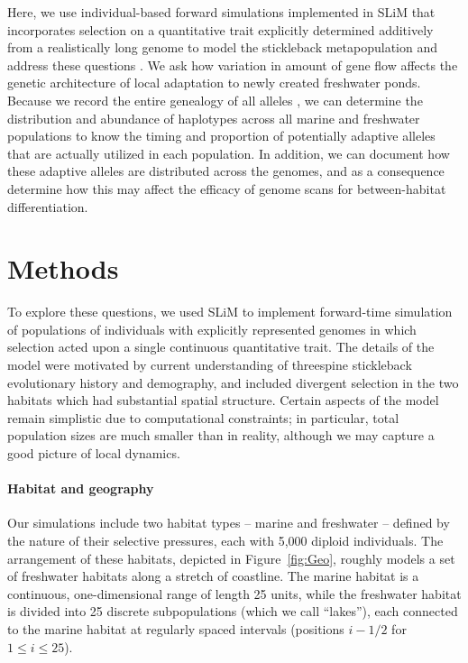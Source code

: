 \documentclass{article}
\begin{document}
Here, we use individual-based forward simulations implemented in SLiM that incorporates selection on a quantitative trait
explicitly determined additively from a realistically long genome to model the stickleback metapopulation and address these questions \citep{haller2017slim,haller2018slim3}. 
We ask how variation in amount of gene flow affects the genetic architecture of local adaptation to newly created freshwater ponds.
Because we record the entire genealogy of all alleles \citep{kelleher2018efficient}, 
we can determine the distribution and abundance of haplotypes across all marine and freshwater populations to know the timing and proportion of potentially adaptive alleles that are actually utilized in each population. 
In addition, we can document how these adaptive alleles are distributed across the genomes, and as a consequence determine how this may affect the efficacy of genome scans for between-habitat differentiation. 


\section*{Methods}

To explore these questions, we used SLiM \citep{haller2017slim,haller2018slim3} to implement forward-time simulation of populations of individuals with explicitly represented genomes in which selection acted upon a single continuous quantitative trait. 
The details of the model were motivated by current understanding of threespine stickleback evolutionary history and demography, and included divergent selection in the two habitats which had substantial spatial structure.
Certain aspects of the model remain simplistic due to computational constraints;
in particular, total population sizes are much smaller than in reality,
although we may capture a good picture of local dynamics.

\paragraph{Habitat and geography}
Our simulations include two habitat types -- marine and freshwater -- defined by the nature of their selective pressures, each with 5,000 diploid individuals. 
The arrangement of these habitats, depicted in Figure~\ref{fig:Geo}, roughly models a set of freshwater habitats along a stretch of coastline. 
The marine habitat is a continuous, one-dimensional range of length 25 units, while the freshwater habitat is divided into 25 discrete subpopulations (which we call ``lakes''), each connected to the marine habitat at regularly spaced intervals (positions $i - 1/2$ for $1 \le i \le 25$).
\end{document}
